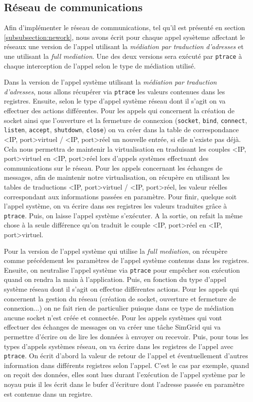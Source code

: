 \subsection{Réseau de communications}
Afin d'implémenter le réseau de communications, tel qu'il est présenté en section \ref{subsubsection:nework}, nous avons écrit pour chaque appel sysèteme affectant le réseaux une version de l'appel utilisant la \textit{médiation par traduction d'adresses} et une utilisant la \textit{full mediation}. Une des deux versions sera exécuté par \texttt{ptrace} à chaque interception de l'appel selon le type de médiation utilisé.

Dans la version de l'appel système utilisant la \textit{médiation par traduction d'adresses}, nous allons récupérer via \texttt{ptrace} les valeurs contenues dans les registres. Ensuite, selon le type d'appel système réseau dont il s'agit on va effectuer des actions différentes. Pour les appels qui concernent la création de socket ainsi que l'ouverture et la fermeture de connexion (\texttt{socket}, \texttt{bind}, \texttt{connect}, \texttt{listen}, \texttt{accept}, \texttt{shutdown}, \texttt{close}) on va créer dans la table de correspondance <IP, port>virtuel / <IP, port>réel un nouvelle entrée, si elle n'existe pas déjà. Cela nous permettra de maintenir la virtualisation en traduisant les couples <IP, port>virtuel en <IP, port>réel lors d'appels systèmes effectuant des communications sur le réseau. Pour les appels concernant les échanges de messages, afin de maintenir notre virtualisation, on récupère en utilisant les tables de traductions <IP, port>virtuel / <IP, port>réel, les valeur réelles correspondant aux informations passées en paramètre. Pour finir, quelque soit l'appel système, on va écrire dans ses registres les valeurs traduites grâce à \texttt{ptrace}. Puis, on laisse l'appel système s'exécuter. A la sortie, on refait la même chose à la seule différence qu'on traduit le couple  <IP, port>réel en <IP, port>virtuel.

Pour la version de l'appel système qui utilise la \textit{full mediation}, on récupère comme précédement les paramètres de l'appel système contenus dans les registres. Ensuite, on neutralise l'appel système via \texttt{ptrace} pour empêcher son exécution quand on rendra la main à l'application. Puis, en fonction du type d'appel système réseau dont il s'agit on effectue différentes actions. Pour les appels qui concernent la gestion du réseau (création de socket, ouverture et fermeture de connexion...) on ne fait rien de particulier puisque dans ce type de médiation aucune socket n'est créée et connectée. Pour les appels systèmes qui vont effectuer des échanges de messages on va créer une tâche SimGrid qui va permettre d'écrire ou de lire les données à envoyer ou recevoir. Puis, pour tous les types d'appels systèmes réseau, on va écrire dans les registres de l'appel avec \texttt{ptrace}. On écrit d'abord la valeur de retour de l'appel et éventuellement d'autres information dans différents registres selon l'appel. C'est le cas par exemple, quand on reçoit des données, elles sont lues durant l'exécution de l'appel système par le noyau puis il les écrit dans le bufer d'écriture dont l'adresse passée en paramètre est contenue dans un registre.
